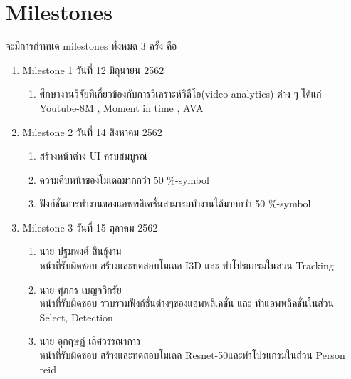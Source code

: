 \section{Milestones}จะมีการกำหนด milestones ทั้งหมด 3 ครั้ง คือ
\begin{enumerate}
	\item Milestone  1  วันที่ 12  มิถุนายน  2562
		\begin{enumerate}\setlength\itemsep{-0.25em}
			\item ศึกษางานวิจัยที่เกี่ยวข้องกับการวิเคราะห์วิดีโอ(video analytics) ต่าง ๆ  ได้แก่ Youtube-8M , Moment in time , AVA
		\end{enumerate}
	\item Milestone  2  วันที่ 14  สิงหาคม 2562
		\begin{enumerate}\setlength\itemsep{-0.25em}
			\item สร้างหน้าต่าง UI ครบสมบูรณ์
			\item ความคืบหน้าของโมเดลมากกว่า 50 \%-symbol
			\item ฟังก์ชั่นการทำงานของแอพพลิเคชั่นสามารถทำงานได้มากกว่า 50 \%-symbol
		\end{enumerate}
	\item Milestone  3  วันที่ 15  ตุลาคม 2562
		\begin{enumerate}\setlength\itemsep{-0.25em}
			\item นาย ปฐมพงศ์ สินธุ์งาม \\หน้าที่รับผิดชอบ สร้างและทดสอบโมเดล I3D และ ทำโปรแกรมในส่วน Tracking
			\item นาย ศุภกร เบญจวิกรัย \\หน้าที่รับผิดชอบ รวบรวมฟังก์ชั่นต่างๆของแอพพลิเคชั่น และ ทำแอพพลิคชั่นในส่วน Select, Detection
			\item นาย อุกฤษฎ์ เลิศวรรณาการ \\หน้าที่รับผิดชอบ สร้างและทดสอบโมเดล Resnet-50และทำโปรแกรมในส่วน Person reid 
		\end{enumerate}
\end{enumerate}



